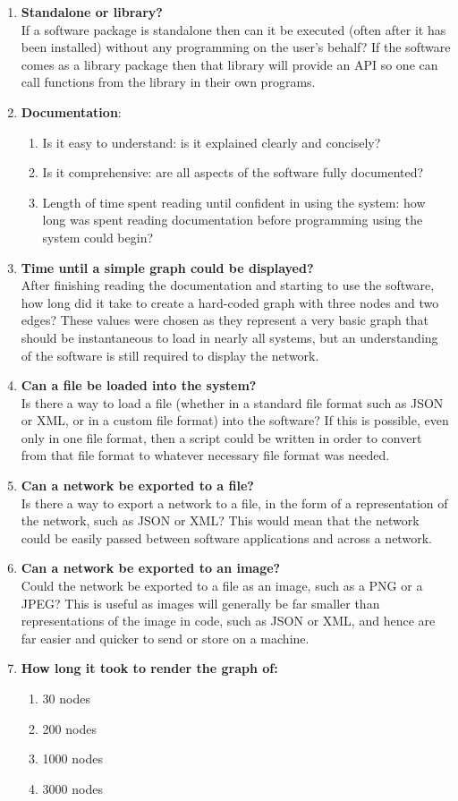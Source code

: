 \documentclass[../dissertation.tex]{subfiles}
\begin{document}
\begin{enumerate}
	\item \textbf{Standalone or library?}\\
	If a software package is standalone then can it be executed (often after it has been installed) without any programming on the user's behalf? If the software comes as a library package then that library will provide an API so one can call functions from the library in their own programs. 
	\item \textbf{Documentation}:
	\begin{enumerate}
		\item Is it easy to understand: is it explained clearly and concisely?
		\item Is it comprehensive: are all aspects of the software fully documented?
		\item Length of time spent reading until confident in using the system: how long was spent reading documentation before programming using the system could begin?
	\end{enumerate}
	\item \textbf{Time until a simple graph could be displayed?}\\
	After finishing reading the documentation and starting to use the software, how long did it take to create a hard-coded graph with three nodes and two edges? These values were chosen as they represent a very basic graph that should be instantaneous to load in nearly all systems, but an understanding of the software is still required to display the network.
	\item \textbf{Can a file be loaded into the system?}\\
	Is there a way to load a file (whether in a standard file format such as JSON or XML, or in a custom file format) into the software? If this is possible, even only in one file format, then a script could be written in order to convert from that file format to whatever necessary file format was needed. 
	\item \textbf{Can a network be exported to a file?}\\
	Is there a way to export a network to a file, in the form of a representation of the network, such as JSON or XML? This would mean that the network could be easily passed between software applications and across a network.
	\item \textbf{Can a network be exported to an image?}\\
	Could the network be exported to a file as an image, such as a PNG or a JPEG? This is useful as images will generally be far smaller than representations of the image in code, such as JSON or XML, and hence are far easier and quicker to send or store on a machine.
	\item \textbf{How long it took to render the graph of:}
	\begin{enumerate}
	    \item 30 nodes
	    \item 200 nodes
	    \item 1000 nodes
	    \item 3000 nodes
	\end{enumerate}
	

\end{enumerate}
\end{document}
